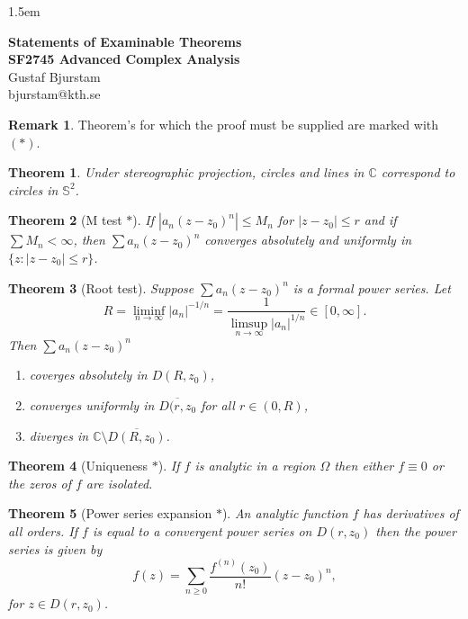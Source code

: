 \documentclass[12pt]{article}
\newtheorem{sats}{Theorem}
\theoremstyle{definition}
\newtheorem*{remark}{Remark}
\newcommand{\C}{\mathbb{C}}    %
\begin{document}
\baselineskip 1.5em

\begin{center}
\textbf{\large Statements of Examinable Theorems \\ SF2745 Advanced Complex Analysis} \\
Gustaf Bjurstam\\
bjurstam@kth.se\\
\end{center}

\begin{remark}
    Theorem's for which the proof must be supplied are marked with $(*)$.
\end{remark}

\begin{sats}
    Under stereographic projection, circles and lines in $\C$ correspond to circles in $\mathbb{S}^2$.
\end{sats}

\begin{sats}[M test {$*$}]
    If $|a_n(z-z_0)^n|\leq M_n$ for $|z-z_0|\leq r$ and if $\sum M_n<\infty$, then $\sum a_n(z-z_0)^n$ converges absolutely and uniformly in $\{z:|z-z_0|\leq r\}$.
\end{sats}

\begin{sats}[Root test]
    Suppose $\sum a_n(z-z_0)^n$ is a formal power series. Let
    \begin{equation*}
        R=\liminf_{n\to\infty} |a_n|^{-1/n}=\frac{1}{\limsup_{n\to\infty} |a_n|^{1/n}}\in [0, \infty].
    \end{equation*}
    Then $\sum a_n(z-z_0)^n$
    \begin{enumerate}[label=(\alph*)]
        \item coverges absolutely in $D(R,z_0)$,
        \item converges uniformly in $\overline{D(r,z_0}$ for all $r\in(0,R)$,
        \item diverges in $\C\setminus\overline{D(R,z_0)}$.
    \end{enumerate}
\end{sats}

\begin{sats}[Uniqueness $*$]
    If $f$ is analytic in a region $\Omega$ then either $f\equiv 0$ or the zeros of $f$ are isolated.
\end{sats}

\begin{sats}[Power series expansion $*$]
An analytic function $f$ has derivatives of all orders. If $f$ is equal to a convergent power series on $D(r,z_0)$ then the power series is given by 
\begin{equation*}
    f(z)=\sum_{n\geq 0} \frac{f^{(n)}(z_0)}{n!}(z-z_0)^n,
\end{equation*}
for $z\in D(r,z_0)$.
\end{sats}
\end{document}
